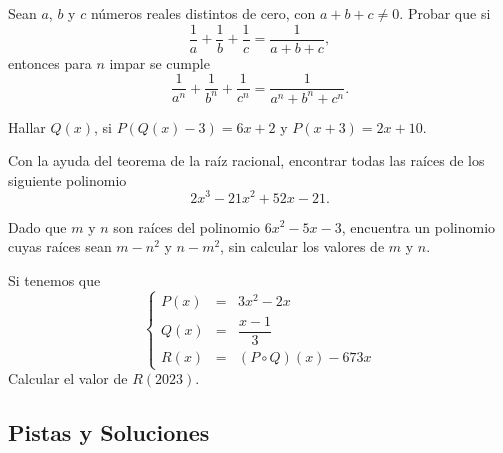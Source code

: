 \begin{section-problem}
    Sean $a$, $b$ y $c$ números reales distintos de cero, con $a + b + c \neq 0$.
    Probar que si
    \[\frac{1}{a} + \frac{1}{b} + \frac{1}{c} = \frac{1}{a + b + c},\]
    entonces para $n$ impar se cumple
    \[\frac{1}{a^n} + \frac{1}{b^n} + \frac{1}{c^n} = \frac{1}{a^n + b^n + c^n}.\]
\end{section-problem}

\begin{section-problem}
    Hallar $Q(x)$, si $P\left(Q(x) - 3\right) = 6x + 2$ y $P(x + 3) = 2x + 10$.
\end{section-problem}

\begin{section-problem}
    Con la ayuda del teorema de la raíz racional, encontrar todas las raíces de los siguiente polinomio
    \[2 x^3 - 21 x^2 + 52 x - 21.\]
\end{section-problem}

\begin{section-problem}
    Dado que $m$ y $n$ son raíces del polinomio $6x^2 - 5x - 3$, encuentra un polinomio cuyas raíces sean
    $m - n^2$ y $n - m^2$, sin calcular los valores de $m$ y $n$.
\end{section-problem}

\begin{section-problem}
    Si tenemos que
    \[
        \left\{
        \begin{array}{rcl}
            P(x) & =& 3x^2 - 2x \\
            Q(x) & =& \dfrac{x - 1}{3} \\
            R(x) & =& (P \circ Q)(x) - 673x
        \end{array}
        \right.
    \]
    Calcular el valor de $R(2023)$.
\end{section-problem}

\subsection{Pistas y Soluciones}
